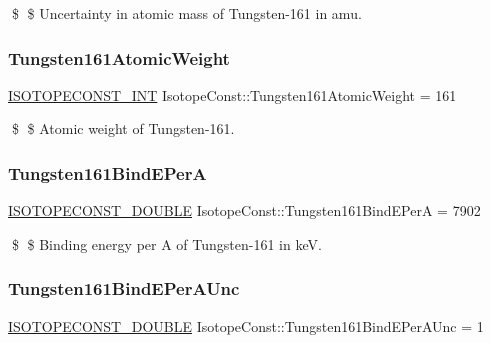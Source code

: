 \$ \$ Uncertainty in atomic mass of Tungsten-\/161 in amu. \mbox{\label{group___isotope_const-_tungsten-_w161_gac336c7fbfabd6cc92a2d53c7647ab65a}} 
\subsubsection{\texorpdfstring{Tungsten161\+Atomic\+Weight}{Tungsten161AtomicWeight}}
{\footnotesize\ttfamily \mbox{\hyperlink{group___isotope_const-_macros_ga5f18360b3e99483a35c32d789e62621c}{I\+S\+O\+T\+O\+P\+E\+C\+O\+N\+S\+T\+\_\+\+I\+NT}} Isotope\+Const\+::\+Tungsten161\+Atomic\+Weight = 161}

\$ \$ Atomic weight of Tungsten-\/161. \mbox{\label{group___isotope_const-_tungsten-_w161_ga622931cec2f4be9ebc50cacec7bf9ce6}} 
\subsubsection{\texorpdfstring{Tungsten161\+Bind\+E\+PerA}{Tungsten161BindEPerA}}
{\footnotesize\ttfamily \mbox{\hyperlink{group___isotope_const-_macros_ga8f45a7272ce02c0b4c65c44636ed719a}{I\+S\+O\+T\+O\+P\+E\+C\+O\+N\+S\+T\+\_\+\+D\+O\+U\+B\+LE}} Isotope\+Const\+::\+Tungsten161\+Bind\+E\+PerA = 7902}

\$ \$ Binding energy per A of Tungsten-\/161 in keV. \mbox{\label{group___isotope_const-_tungsten-_w161_ga7a1b842688bc9ffb0651bce275bd2eed}} 
\subsubsection{\texorpdfstring{Tungsten161\+Bind\+E\+Per\+A\+Unc}{Tungsten161BindEPerAUnc}}
{\footnotesize\ttfamily \mbox{\hyperlink{group___isotope_const-_macros_ga8f45a7272ce02c0b4c65c44636ed719a}{I\+S\+O\+T\+O\+P\+E\+C\+O\+N\+S\+T\+\_\+\+D\+O\+U\+B\+LE}} Isotope\+Const\+::\+Tungsten161\+Bind\+E\+Per\+A\+Unc = 1}

